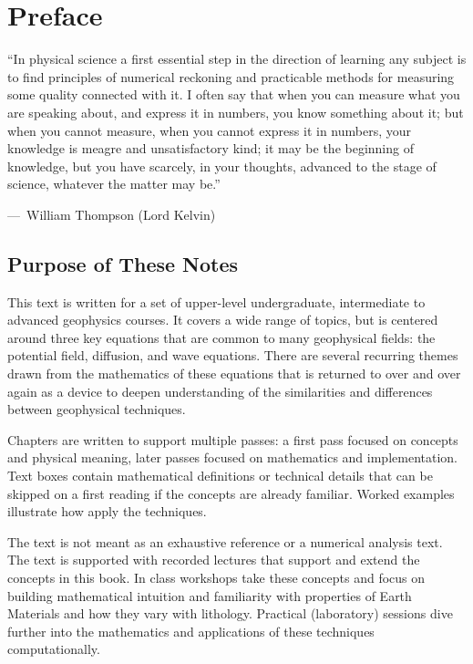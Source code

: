 \chapter*{Preface}
{}

\epigraph{ ``In physical science a first essential step in the direction of learning any subject is to find principles of numerical reckoning and practicable methods for measuring some quality connected with it.  I often say that when you can measure what you are speaking about, and express it in numbers, you know something about it; but when you cannot measure, when you cannot express it in numbers, your knowledge is meagre and unsatisfactory kind; it may be the beginning of knowledge, but you have scarcely, in your thoughts, advanced to the stage of science, whatever the matter may be.''}
{{\normalfont ---\ William Thompson (Lord Kelvin)}}


\section*{Purpose of These Notes}

This text is written for a set of upper-level undergraduate, intermediate to advanced geophysics courses.  It covers a wide range of topics, but is centered around three key equations that are common to many geophysical fields: the potential field, diffusion, and wave equations.  There are several recurring themes drawn from the mathematics of these equations that is returned to over and over again as a device to deepen understanding of the similarities and differences between geophysical techniques.

Chapters are written to support multiple passes: a first pass focused on concepts and physical meaning, later passes focused on mathematics and implementation.  Text boxes contain mathematical definitions or technical details that can be skipped on a first reading if the concepts are already familiar.  Worked examples illustrate how apply the techniques.

The text is not meant as an exhaustive reference or a numerical analysis text.  The text is supported with recorded lectures that support and extend the concepts in this book.  In class workshops take these concepts and focus on building mathematical intuition and familiarity with properties of Earth Materials and how they vary with lithology. Practical (laboratory) sessions dive further into the mathematics and applications of these techniques computationally.

